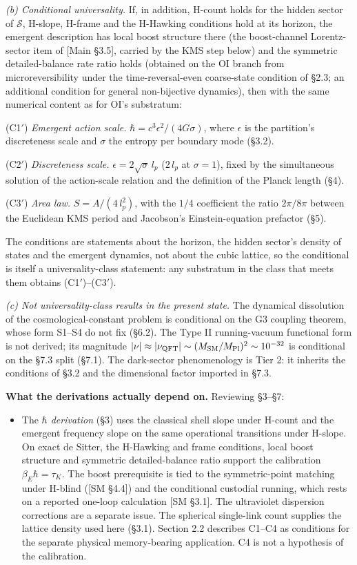 \documentclass[
]{article}
\providecommand{\tightlist}{%
  \setlength{\itemsep}{0pt}\setlength{\parskip}{0pt}}
\begin{document}
\emph{(b) Conditional universality.} If, in addition, H-count holds for
the hidden sector of \(\mathcal{S}\), H-slope, H-frame and the H-Hawking
conditions hold at its horizon, the emergent description has local boost
structure there (the boost-channel Lorentz-sector item of {[}Main
§3.5{]}, carried by the KMS step below) and the symmetric
detailed-balance rate ratio holds (obtained on the OI branch from
microreversibility under the time-reversal-even coarse-state condition
of §2.3; an additional condition for general non-bijective dynamics),
then with the same numerical content as for OI's substratum:

(C1\('\)) \emph{Emergent action scale.}
\(\hbar = c^3 \epsilon^2 / (4G\sigma)\), where \(\epsilon\) is the
partition's discreteness scale and \(\sigma\) the entropy per boundary
mode (§3.2).

(C2\('\)) \emph{Discreteness scale.} \(\epsilon = 2\sqrt{\sigma}\,l_p\)
(\(2\,l_p\) at \(\sigma = 1\)), fixed by the simultaneous solution of
the action-scale relation and the definition of the Planck length (§4).

(C3\('\)) \emph{Area law.} \(S = A/(4\,l_p^2)\), with the \(1/4\)
coefficient the ratio \(2\pi/8\pi\) between the Euclidean KMS period and
Jacobson's Einstein-equation prefactor (§5).

The conditions are statements about the horizon, the hidden sector's
density of states and the emergent dynamics, not about the cubic
lattice, so the conditional is itself a universality-class statement:
any substratum in the class that meets them obtains
(C1\('\))--(C3\('\)).

\emph{(c) Not universality-class results in the present state.} The
dynamical dissolution of the cosmological-constant problem is
conditional on the G3 coupling theorem, whose form S1--S4 do not fix
(§6.2). The Type II running-vacuum functional form is not derived; its
magnitude
\(|\nu| \approx |\nu_{\rm QFT}| \sim (M_{\rm SM}/M_{\rm Pl})^2 \sim 10^{-32}\)
is conditional on the §7.3 split (§7.1). The dark-sector phenomenology
is Tier 2: it inherits the conditions of §3.2 and the dimensional factor
imported in §7.3.

\textbf{What the derivations actually depend on.} Reviewing §3--§7:

\begin{itemize}
\tightlist
\item
  The \emph{\(\hbar\) derivation} (§3) uses the classical shell slope
  under H-count and the emergent frequency slope on the same operational
  transitions under H-slope. On exact de Sitter, the H-Hawking and frame
  conditions, local boost structure and symmetric detailed-balance ratio
  support the calibration \(\beta_E\hbar=\tau_K\). The boost
  prerequisite is tied to the symmetric-point matching under H-blind
  ({[}SM §4.4{]}) and the conditional custodial running, which rests on
  a reported one-loop calculation {[}SM §3.1{]}. The ultraviolet
  dispersion corrections are a separate issue. The spherical single-link
  count supplies the lattice density used here (§3.1). Section 2.2
  describes C1--C4 as conditions for the separate physical
  memory-bearing application. C4 is not a hypothesis of the calibration.
\end{itemize}
\end{document}
